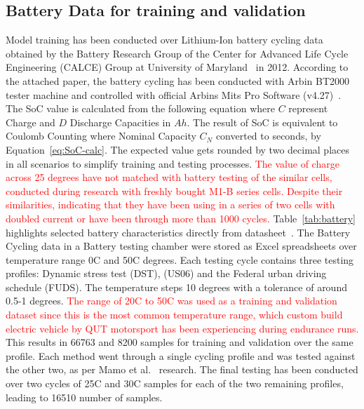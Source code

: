 \subsection{Battery Data for training and validation} \label{subsec:b_data}
Model training has been conducted over Lithium-Ion battery cycling data obtained by the Battery Research Group of the Center for Advanced Life
Cycle Engineering (CALCE) Group at University of Maryland~\cite{noauthor_calce_2017} in 2012.
According to the attached paper, the battery cycling has been conducted with Arbin BT2000 tester machine and controlled with official Arbins Mits Pro Software (v4.27)~\cite{xing_state_2014}.
The SoC value is calculated from the following equation where $C$ represent Charge and $D$ Discharge Capacities in $Ah$.
The result of SoC is equivalent to Coulomb Counting where Nominal Capacity $C_{N}$ converted to seconds, by \mbox{Equation~\ref{eq:SoC-calc}}.
The expected value gets rounded by two decimal places in all scenarios to simplify training and testing processes. 
\textcolor{red}{The value of charge across 25 degrees have not matched with battery testing of the similar cells, conducted during research with freshly bought M1-B series cells.
Despite their similarities, indicating that they have been using in a series of two cells with doubled current or have been through more than 1000 cycles.}
\mbox{Table~\ref{tab:battery}} highlights selected battery characteristics directly from datasheet~\cite{noauthor_anr26650m1a}.
The Battery Cycling data in a Battery testing chamber were stored as Excel spreadsheets over temperature range 0\textdegree{}C and 50\textdegree{}C degrees.
Each testing cycle contains three testing profiles: Dynamic stress test (DST), (US06) and the Federal urban driving schedule (FUDS).
The temperature steps 10 degrees with a tolerance of around 0.5-1 degrees.
\textcolor{red}{The range of 20\textdegree{}C to 50\textdegree{}C was used as a training and validation dataset since this is the most common temperature range, which custom build electric vehicle by QUT motorsport has been experiencing during endurance runs.}
This results in 66763 and 8200 samples for training and validation over the same profile.
Each method went through a single cycling profile and was tested against the other two, as per Mamo et al.~\cite{mamo_long_2020} research.
The final testing has been conducted over two cycles of 25\textdegree{}C and 30\textdegree{}C samples for each of the two remaining profiles, leading to 16510 number of samples.

